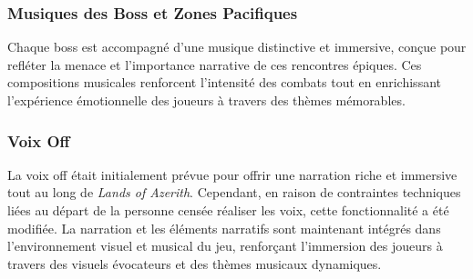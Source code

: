 \subsubsection{Musiques des Boss et Zones Pacifiques}

Chaque boss est accompagné d'une musique distinctive et immersive, conçue pour refléter la menace et l'importance narrative de ces rencontres épiques.
Ces compositions musicales renforcent l'intensité des combats tout en enrichissant l'expérience émotionnelle des joueurs à travers des thèmes mémorables.

\subsubsection{Voix Off}

La voix off était initialement prévue pour offrir une narration riche et immersive tout au long de \textit{Lands of Azerith}.
Cependant, en raison de contraintes techniques liées au départ de la personne censée réaliser les voix, cette fonctionnalité a été modifiée.
La narration et les éléments narratifs sont maintenant intégrés dans l'environnement visuel et musical du jeu, renforçant l'immersion des joueurs à travers des visuels évocateurs et des thèmes musicaux dynamiques.

